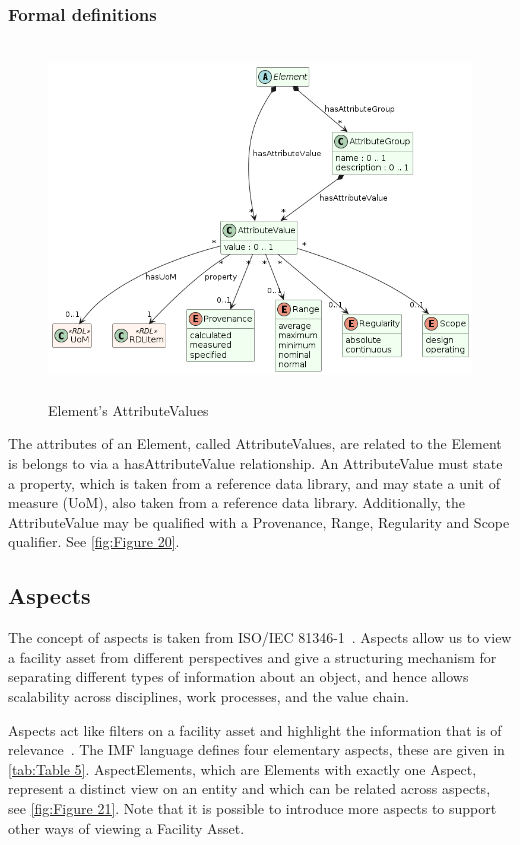 \subsubsection{Formal definitions}
\begin{figure}[htb]
  \centering
  \includegraphics[width=5in,height=3.6875in]{img/IMFmanual-img039.png}
  \caption{Element's AttributeValues}
  \label{fig:Figure 20}
\end{figure}

The attributes of an Element, called AttributeValues, are related to the Element is belongs to via a hasAttributeValue
relationship. An AttributeValue must state a property, which is taken from a reference data library, and may state a
unit of measure (UoM), also taken from a reference data library. Additionally, the AttributeValue may be qualified
with a Provenance, Range, Regularity and Scope qualifier. See \autoref{fig:Figure 20}.

\subsection{Aspects}
The concept of aspects is taken from ISO/IEC 81346-1~\cite{81346-1}. Aspects allow us to view a
facility asset from different perspectives and give a structuring mechanism for separating different types of
information about an object, and hence allows scalability across disciplines, work processes, and the value chain.

Aspects act like filters on a facility asset and highlight the information that is of relevance~\cite{81346-1}. The IMF language
defines four elementary aspects, these are given in \autoref{tab:Table 5}. AspectElements, which are Elements with exactly one
Aspect, represent a distinct view on an entity and which can be related across aspects, see \autoref{fig:Figure 21}. Note that it is possible to introduce more aspects to support other ways of viewing a Facility Asset.

